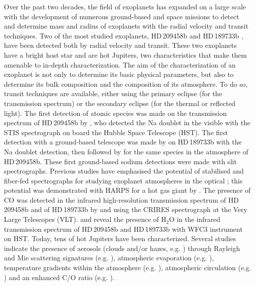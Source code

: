 \documentclass{aa}
\begin{document}
Over the past two decades, the field of exoplanets has expanded on a large scale with the development of numerous ground-based and space missions to detect and determine mass and radius of exoplanets with the radial velocity and transit techniques. Two of the most studied exoplanets, HD\,209458b \citep{charbonneau_detection_2000} and HD\,189733b \citep{bouchy_elodie_2005}, have been detected both by radial velocity and transit. These two exoplanets have a bright host star and are hot Jupiters, two characteristics that make them amenable to in-depth characterization. The aim of the characterization of an exoplanet is not only to determine its basic physical parameters, but also to determine its bulk composition and the composition of its atmosphere. To do so, transit techniques are available, either using the primary eclipse (for the transmission spectrum) or the secondary eclipse (for the thermal or reflected light). The first detection of atomic species was made on the transmission spectrum of HD\,209458b by \cite{charbonneau_detection_2002}, who detected the Na doublet in the visible with the STIS spectrograph on board the Hubble Space Telescope (HST). The first detection with a ground-based telescope was made by \cite{redfield_sodium_2008} on HD\,189733b with the Na doublet detection, then followed by \cite{snellen_ground-based_2008} for the same species in the atmosphere of HD\,209458b. These first ground-based sodium detections were made with slit spectrographs. Previous studies have emphasised the potential of stabilised and fiber-fed spectrographs for studying exoplanet atmospheres in the optical \citep{vidal-madjar_earth_2010,arnold_earth_2014}; this potential was demonstrated with HARPS for a hot gas giant by \cite{wyttenbach_spectrally_2015}. The presence of CO was detected in the infrared high-resolution transmission spectrum of HD\,209458b and of HD\,189733b by \cite{snellen_orbital_2010} and \cite{brogi_rotation_2016} using the CRIRES spectrograph at the Very Large Telescopes (VLT). \citet{deming_infrared_2013} and \citet{mccullough_water_2014} reveal the presence of H$_{2}$O in the infrared transmission spectrum of HD\,209458b and HD\,189733b with WFC3 instrument on HST. Today, tens of hot Jupiters have been characterized. Several studies indicate the presence of aerosols (clouds and/or hazes, e.g. \citealt{sing_continuum_2016}) through Rayleigh and Mie scattering signatures (e.g. \citealp{lecavelier_des_etangs_rayleigh_2008,sing_hst_2013,sing_hst_2015}), atmospheric evaporation (e.g. \citealp{lecavelier_des_etangs_evaporation_2010,bourrier_atmospheric_2013,ehrenreich_giant_2015}), temperature gradients within the atmosphere (e.g. \citealp{huitson_temperaturepressure_2012,wyttenbach_spectrally_2015,heng_non-isothermal_2015}), atmospheric circulation (e.g. \citealt{snellen_orbital_2010,kataria_atmospheric_2016,wyttenbach_spectrally_2015,louden_spatially_2015}) and an enhanced C/O ratio (e.g. \citealp{madhusudhan_high_2011,moses_chemical_2013,kreidberg_detection_2015}).\\
\end{document}
